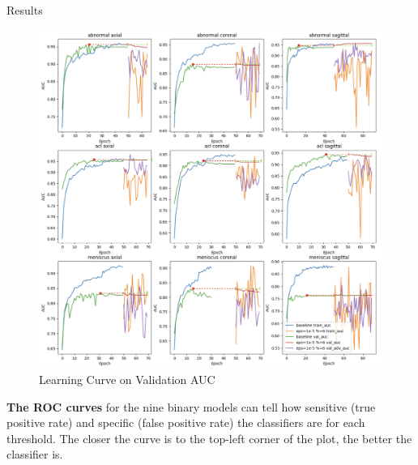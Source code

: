 \documentclass[final]{beamer}
\newlength{\colwidth}
\begin{document}
\begin{frame}[t]
\begin{columns}[t]
\begin{column}{\colwidth}
\begin{block}{Results}
    \begin{figure}[!htp]
    \centering
    \includegraphics[width=1\textwidth]{val-auc-1.png}
    \caption{\label{fig:curve}Learning Curve on Validation AUC}
    \end{figure}

    \textbf{The ROC curves} for the nine binary models can tell how sensitive (true positive rate) and specific (false positive rate) the classifiers are for each threshold. The closer the curve is to the top-left corner of the plot, the better the classifier is.
    

\end{block}
\end{column}
\end{columns}
\end{frame}
\end{document}
